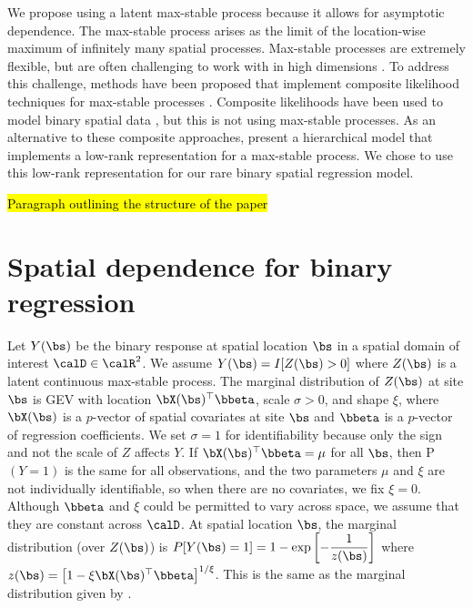 We propose using a latent max-stable process \citep{deHaan1984} because it allows for asymptotic dependence.
The max-stable process arises as the limit of the location-wise maximum of infinitely many spatial processes.
Max-stable processes are extremely flexible, but are often challenging to work with in high dimensions \citep{Wadsworth2014,Thibaud2013a}.
To address this challenge, methods have been proposed that implement composite likelihood techniques for max-stable processes \citep{Padoan2010,Genton2011,Huser2014}.
Composite likelihoods have been used to model binary spatial data \citep{Heagerty1998}, but this is not using max-stable processes.
As an alternative to these composite approaches, \citet{Reich2012} present a hierarchical model that implements a low-rank representation for a max-stable process.
We chose to use this low-rank representation for our rare binary spatial regression model.

\hl{Paragraph outlining the structure of the paper}

\section{Spatial dependence for binary regression} \label{rbs:maxstab}
Let $Y(\bs)$ be the binary response at spatial location $\bs$ in a spatial domain of interest $\calD \in \calR^2$.
We assume $Y(\bs) = I[Z(\bs) > 0]$ where $Z(\bs)$ is a latent continuous max-stable process.
The marginal distribution of $Z(\bs)$ at site $\bs$ is GEV with location $\bX(\bs)^\top \bbeta$, scale $\sigma > 0$, and shape $\xi$, where $\bX(\bs)$ is a $p$-vector of spatial covariates at site $\bs$ and $\bbeta$ is a $p$-vector of regression coefficients.
We set $\sigma = 1$ for identifiability because only the sign and not the scale of $Z$ affects $Y$.
If $\bX(\bs)^\top \bbeta = \mu$ for all $\bs$, then P$(Y = 1)$ is the same for all observations, and the two parameters $\mu$ and $\xi$ are not individually identifiable, so when there are no covariates, we fix $\xi = 0$.
Although $\bbeta$ and $\xi$ could be permitted to vary across space, we assume that they are constant across $\calD$.
At spatial location $\bs$, the marginal distribution (over $Z(\bs)$) is \mbox{$P[Y(\bs) = 1] = 1 - \exp\left[ -\displaystyle\frac{ 1 }{ z(\bs)} \right]$} where $z(\bs) = \left[1 - \xi \bX(\bs)^\top \bbeta\right]^{1 / \xi}$.
This is the same as the marginal distribution given by \citet{Wang2010}.


